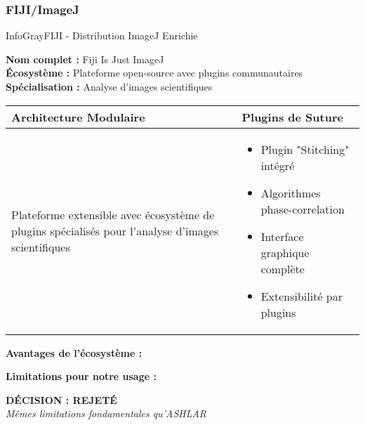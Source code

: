 \subsubsection{FIJI/ImageJ}

\begin{techbox}{InfoGray}{FIJI - Distribution ImageJ Enrichie}

\textbf{Nom complet :} Fiji Is Just ImageJ \\
\textbf{Écosystème :} Plateforme open-source avec plugins communautaires \\
\textbf{Spécialisation :} Analyse d'images scientifiques

\vspace{0.5cm}

\begin{tabularx}{\textwidth}{|X|X|}
\hline
\rowcolor{LightGray}
\textbf{Architecture Modulaire} & \textbf{Plugins de Suture} \\
\hline
Plateforme extensible avec écosystème de plugins spécialisés pour l'analyse d'images scientifiques &
\begin{itemize}[nosep]
\item Plugin "Stitching" intégré
\item Algorithmes phase-correlation
\item Interface graphique complète
\item Extensibilité par plugins
\end{itemize} \\
\hline
\end{tabularx}

\vspace{0.5cm}

\textbf{Avantages de l'écosystème :}
\begin{itemize}[leftmargin=*]
\end{itemize}

\textbf{Limitations pour notre usage :}
\begin{itemize}[leftmargin=*]
\end{itemize}

\begin{center}
\textbf{\textcolor{DangerRed}{DÉCISION : REJETÉ}}\\
\textit{Mêmes limitations fondamentales qu'ASHLAR}
\end{center}

\end{techbox}

